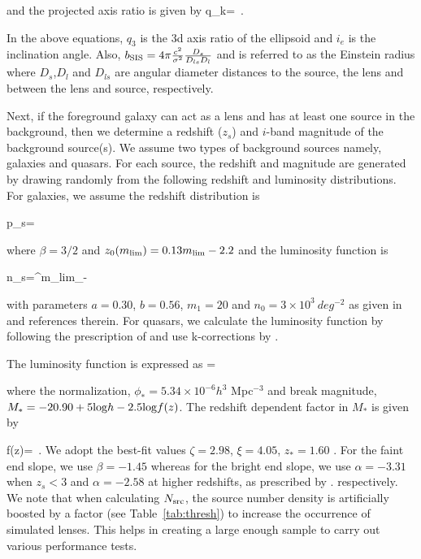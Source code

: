 \documentclass[useAMS,usenatbib,a4paper]{mn2e}
\begin{document}
and the projected axis ratio is given by
\be
q_k= \,.
\ee

In the above equations, $q_3$ is the 3d axis ratio of the ellipsoid and $i_e$ is
the inclination angle. Also, $b_{\rm SIS}= 4\pi
\frac{c^2}{\sigma^2}\frac{D_{s}}{D_{ls}D_l}$ and is referred to as the
Einstein radius where $D_s$,$D_l$ and $D_{ls}$ are angular diameter distances to
the source, the lens and between the lens and source, respectively.


Next, if the foreground galaxy can act as a lens and has at least one source in the
background, then we determine a redshift ($z_s$) and $i$-band magnitude of the
background source(s). We assume two types of background sources namely, galaxies
and quasars. For each source, the redshift and magnitude are generated by drawing randomly from
the following redshift and luminosity distributions. For
galaxies, we assume the redshift distribution is 

\be
\label{eqn:ps}
p_s=
\ee

where $\beta=3/2$ and $z_0(m_{\rm lim})=0.13m_{\rm lim} - 2.2$ and the
luminosity function is

\be
\label{eqn:ns}
n_s=\int^{m_{\rm lim}}_{-\infty} 
\ee

with parameters $a=0.30$, $b=0.56$, $m_1=20$ and $n_0=3\times10^3~deg^{-2}$ as
given in \citep{Faure2009} and references therein. For quasars, we calculate
the luminosity function by following the prescription of \citep{Ogur2010} and
use k-corrections by \citep{Richards2006}. 

The luminosity function is expressed as
\be
{}=
\ee

where the normalization, $\phi_{*}=5.34\times10^{-6} h^3$ Mpc$^{-3}$ and break
magnitude, $M_*=-20.90 + 5 {\rm log} h - 2.5 {\rm log} f(z)$. The redshift
dependent factor in $M_*$ is given by

\be
f(z)= \,.
\ee
We adopt the best-fit values $\zeta=2.98$, $\xi=4.05$, $z_{*}=1.60$
\citep{Oguri2010}. For the faint end slope, we use $\beta=-1.45$ whereas for
the bright end slope, we use $\alpha=-3.31$ when $z_s<3$ and $\alpha=-2.58$ at
higher redshifts, as prescribed by \citep{Oguri2010}. 
respectively. We note that when calculating $N_{\rm src}$, the source
number density is artificially boosted by a factor (see Table~\ref{tab:thresh})
to increase the occurrence of simulated lenses. This helps in creating a large
enough sample to carry out various performance tests.
\end{document}
